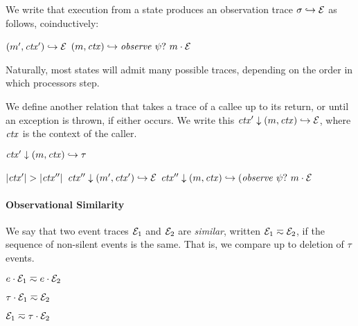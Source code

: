 \documentclass[10pt,conference]{ieeetran}%
\theoremstyle{definition}
\begin{document}
We write that execution from a state produces an observation trace \(\sigma \hookrightarrow \mathcal{E}\)
as follows, coinductively:

            {\((m',\mathit{ctx}') \hookrightarrow \mathcal{E}\)}
            {\((m,\mathit{ctx}) \hookrightarrow \mathit{observe} ~ \psi? ~ m \cdot \mathcal{E}\)}

Naturally, most states will admit many possible traces, depending on the order in which
processors step.

We define another relation that takes a trace of a callee up to its return, or until
an exception is thrown, if either occurs.
We write this \(\mathit{ctx}' \downarrow (m,\mathit{ctx}) \hookrightarrow \mathcal{E}\), where \(\mathit{ctx}\)
is the context of the caller.

         {\(\mathit{ctx}' \downarrow (m,\mathit{ctx}) \hookrightarrow \tau\)}

                  {\(|\mathit{ctx}'| > |\mathit{ctx}''|\)}
                  {\(\mathit{ctx}'' \downarrow (m',\mathit{ctx}') \hookrightarrow \mathcal{E}\)}
                  {\(\mathit{ctx}'' \downarrow (m,\mathit{ctx}) \hookrightarrow (\mathit{observe} ~ \psi? ~ m \cdot \mathcal{E}\)}

\paragraph*{Observational Similarity}

We say that two event traces $\mathcal{E}_1$ and $\mathcal{E}_2$ are {\em similar},
written \(\mathcal{E}_1 \eqsim \mathcal{E}_2\), if the sequence of non-silent events
is the same. That is, we compare up to deletion of \(\tau\) events.

\begin{minipage}{.4\columnwidth}
  \judgment{}{\(\obsT \eqsim \obsT\)}
\end{minipage}
\begin{minipage}{.4\columnwidth}
           {\(e \cdot \mathcal{E}_1 \eqsim e \cdot \mathcal{E}_2\)}
\end{minipage}

\begin{minipage}{.4\columnwidth}
           {\(\tau \cdot \mathcal{E}_1 \eqsim \mathcal{E}_2\)}
\end{minipage}
\begin{minipage}{.4\columnwidth}
           {\(\mathcal{E}_1 \eqsim \tau \cdot \mathcal{E}_2\)}
\end{minipage}
\end{document}
